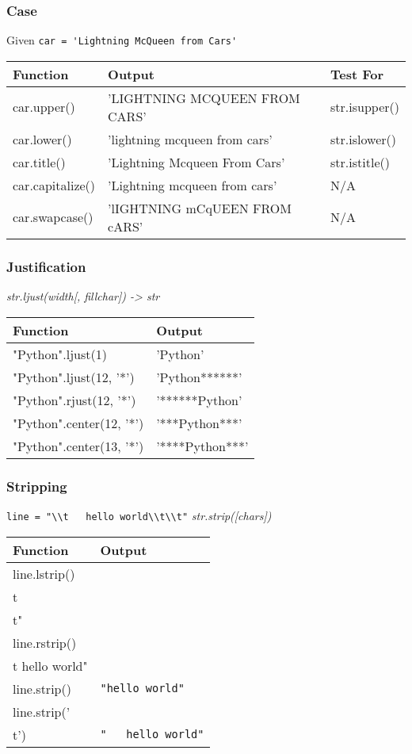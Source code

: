 \documentclass{beamer}
\begin{document}
%
%
\begin{frame}
  \frametitle{Case}
  Given \lstinline{car = 'Lightning McQueen from Cars'}
  \begin{table}
    \begin{tabular}{l | l | l}
    Function & Output & Test For \\
    \hline
    car.upper() & 'LIGHTNING MCQUEEN FROM CARS' & str.isupper() \\
    car.lower() & 'lightning mcqueen from cars' & str.islower() \\
    car.title() & 'Lightning Mcqueen From Cars' & str.istitle() \\
    car.capitalize() & 'Lightning mcqueen from cars' & N/A \\
    car.swapcase() & 'lIGHTNING mCqUEEN FROM cARS' & N/A
    \end{tabular}
  \end{table}
\end{frame}


%
%
\begin{frame}
  \frametitle{Justification}
  \textit{str.ljust(width[, fillchar]) -> str}
  \begin{table}
    \begin{tabular}{l | l}
    Function & Output \\
    \hline
    "Python".ljust(1) & 'Python' \\
    "Python".ljust(12, '*') & 'Python******' \\
    "Python".rjust(12, '*') & '******Python' \\
    "Python".center(12, '*') & '***Python***' \\
    "Python".center(13, '*') & '****Python***'
    \end{tabular}
  \end{table}
\end{frame}


%
%
\begin{frame}
  \frametitle{Stripping}
  \lstinline{line = "\\t   hello world\\t\\t"}
  \textit{str.strip([chars])}
  \begin{table}
    \begin{tabular}{l | l}
    Function & Output \\
    \hline
    line.lstrip() & \lstinline{"hello world\\t\\t"} \\
    line.rstrip() & \lstinline{"\\t   hello world"} \\
    line.strip() & \lstinline{"hello world"} \\
    line.strip('\\t') & \lstinline{"   hello world"}
    \end{tabular}
  \end{table}
\end{frame}
\end{document}
